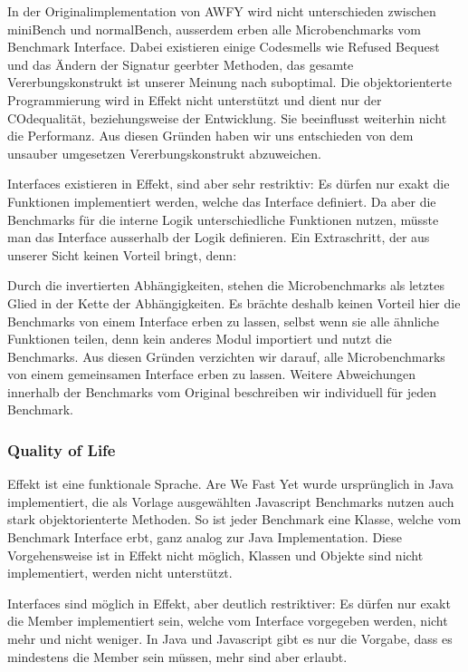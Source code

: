 In der Originalimplementation von AWFY wird nicht unterschieden zwischen miniBench und normalBench, ausserdem erben alle Microbenchmarks vom Benchmark Interface. Dabei existieren einige Codesmells wie Refused Bequest und das Ändern der Signatur geerbter Methoden, das gesamte Vererbungskonstrukt ist unserer Meinung nach suboptimal. Die objektorienterte Programmierung wird in Effekt nicht unterstützt und dient nur der COdequalität, beziehungsweise der Entwicklung. Sie beeinflusst weiterhin nicht die Performanz. Aus diesen Gründen haben wir uns entschieden von dem unsauber umgesetzen Vererbungskonstrukt abzuweichen.

Interfaces existieren in Effekt, sind aber sehr restriktiv: Es dürfen nur exakt die Funktionen implementiert werden, welche das Interface definiert. Da aber die Benchmarks für die interne Logik unterschiedliche Funktionen nutzen, müsste man das Interface ausserhalb der Logik definieren. Ein Extraschritt, der aus unserer Sicht keinen Vorteil bringt, denn:

Durch die invertierten Abhängigkeiten, stehen die Microbenchmarks als letztes Glied in der Kette der Abhängigkeiten. Es brächte deshalb keinen Vorteil hier die Benchmarks von einem Interface erben zu lassen, selbst wenn sie alle ähnliche Funktionen teilen, denn kein anderes Modul importiert und nutzt die Benchmarks. 
Aus diesen Gründen verzichten wir darauf, alle Microbenchmarks von einem gemeinsamen Interface erben zu lassen.
Weitere Abweichungen innerhalb der Benchmarks vom Original beschreiben wir individuell für jeden Benchmark.


\subsubsection{ Quality of Life }
Effekt ist eine funktionale Sprache. Are We Fast Yet wurde ursprünglich in Java implementiert, die als Vorlage ausgewählten Javascript Benchmarks nutzen auch stark objektorienterte Methoden.
So ist jeder Benchmark eine Klasse, welche vom Benchmark Interface erbt, ganz analog zur Java Implementation.
Diese Vorgehensweise ist in Effekt nicht möglich, Klassen und Objekte sind nicht implementiert, werden nicht unterstützt.

Interfaces sind möglich in Effekt, aber deutlich restriktiver: Es dürfen nur exakt die Member implementiert sein, welche vom Interface vorgegeben werden, nicht mehr und nicht weniger.
In Java und Javascript gibt es nur die Vorgabe, dass es mindestens die Member sein müssen, mehr sind aber erlaubt.

